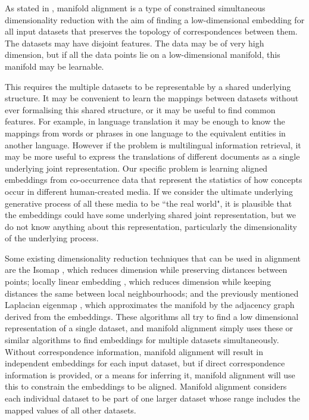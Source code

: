 As stated in \cite{ManifoldLearningTheoryAndApplications}, manifold alignment is a type of constrained simultaneous dimensionality reduction with the aim of finding a low-dimensional embedding for all input datasets that preserves the topology of correspondences between them. The datasets may have disjoint features. The data may be of very high dimension, but if all the data points lie on a low-dimensional manifold, this manifold may be learnable.  

This requires the multiple datasets to be representable by a shared underlying structure. It may be convenient to learn the mappings between datasets without ever formalising this shared structure, or it may be useful to find common features. For example, in language translation it may be enough to know the mappings from words or phrases in one language to the equivalent entities in another language. However if the problem is multilingual information retrieval, it may be more useful to express the translations of different documents as a single underlying joint representation. Our specific problem is learning aligned embeddings from co-occurrence data that represent the statistics of how concepts occur in different human-created media. If we consider the ultimate underlying generative process of all these media to be ``the real world", it is plausible that the embeddings could have some underlying shared joint representation, but we do not know anything about this representation, particularly the dimensionality of the underlying process. 

Some existing dimensionality reduction techniques that can be used in alignment are the Isomap \cite{Isomap}, which reduces dimension while preserving distances between points; locally linear embedding \cite {LocallyLinearEmbedding}, which reduces dimension while keeping distances the same between local neighbourhoods; and the previously mentioned Laplacian eigenmap \cite{LaplacianEigenmaps}, which approximates the manifold by the adjacency graph derived from the embeddings. These algorithms all try to find a low dimensional representation of a single dataset, and manifold alignment simply uses these or similar algorithms to find embeddings for multiple datasets simultaneously. Without correspondence information, manifold alignment will result in independent embeddings for each input dataset, but if direct correspondence information is provided, or a means for inferring it, manifold alignment will use this to constrain the embeddings to be aligned. Manifold alignment considers each individual dataset to be part of one larger dataset whose range includes the mapped values of all other datasets. 

